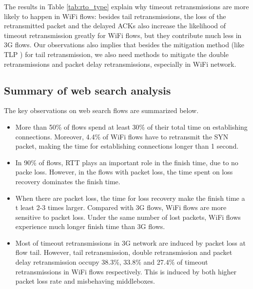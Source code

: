 The results in Table \ref{tab:rto_type} explain why timeout retransmissions are more likely to happen in WiFi flows: besides tail retransmissions, the loss of the retransmitted packet and the delayed ACKs also increase the likelihood of timeout retransmission greatly for WiFi flows, but they contribute much less in 3G flows. Our observations also implies that besides the mitigation method (like TLP \cite{flach2013reducing}) for tail retransmission, we also need methods to mitigate the double retransmissions and packet delay retransmissions, especially in WiFi network.

\subsection{Summary of web search analysis}

The key observations on web search flows are summarized below.

\begin{itemize}
	\item More than 50\% of flows spend at least 30\% of their total time on establishing connections. Moreover, 4.4\% of WiFi flows have to retransmit the SYN packet, making the time for establishing connections longer than 1 second.
	\item In 90\% of flows, RTT plays an important role in the finish time, due to no packe loss. However, in the flows with packet loss, the time spent on loss recovery dominates the finish time.
	\item When there are packet loss, the time for loss recovery make the finish time a t least 2-3 times larger. Compared with 3G flows, WiFi flows are more sensitive to packet loss. Under the same number of lost packets, WiFi flows experience much longer finish time than 3G flows.
	\item Most of timeout retransmissions in 3G network are induced by packet loss at flow tail. However, tail retransmission, double retransmission and packet delay retransmission occupy 38.3\%, 33.8\% and 27.4\% of timeout retransmissions in WiFi flows respectively. This is induced by both higher packet loss rate and misbehaving middleboxes.
\end{itemize}
